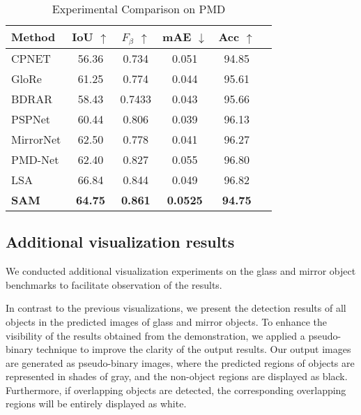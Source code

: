 \documentclass{article}
\begin{document}
\begin{table}%
    \centering
    \begin{tabular}{lccccc} %
    \toprule
    Method & IoU $\uparrow$ &${F}_{\beta}$ $\uparrow$ & mAE $\downarrow$ &Acc $\uparrow$ \\
    \midrule
    CPNET \cite{yu2020context}  &56.36 &0.734 &0.051& 94.85 \\
    GloRe \cite{chen2019graph_global} &61.25 &0.774 &0.044 & 95.61\\
    BDRAR\cite{zhu2018bidirectional}  &  58.43 & 0.7433  & 0.043  &95.66 \\
    PSPNet  \cite{zhao2017pyramid} &60.44 &0.806    &0.039 &96.13  \\
    MirrorNet \cite{yang2019my} &62.50 & 0.778  &0.041  & 96.27\\
    PMD-Net \cite{lin2020progressive}  &62.40 & 0.827 &0.055    & 96.80 \\
    LSA  \cite{guan2022learning} &66.84 & 0.844 &0.049  & 96.82\\
    \midrule
    \textbf{SAM} & \textbf{64.75} & \textbf{0.861} &\textbf{0.0525} & \textbf{94.75}\\
    \bottomrule
    \end{tabular}
    \caption{Experimental Comparison on PMD
    }    %
    \label{PMD}
\end{table}

\subsection{Additional visualization results}

We conducted additional visualization experiments on the glass and mirror object benchmarks to facilitate observation of the results.

In contrast to the previous visualizations, we present the detection results of all objects in the predicted images of glass and mirror objects. To enhance the visibility of the results obtained from the demonstration, we applied a pseudo-binary technique to improve the clarity of the output results. Our output images are generated as pseudo-binary images, where the predicted regions of objects are represented in shades of gray, and the non-object regions are displayed as black. Furthermore, if overlapping objects are detected, the corresponding overlapping regions will be entirely displayed as white.
\end{document}
